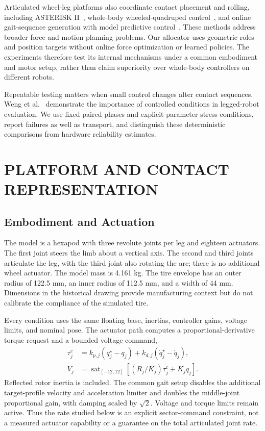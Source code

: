 \documentclass[letterpaper,10pt,conference]{ieeeconf}
\begin{document}
Articulated wheel-leg platforms also coordinate contact placement and rolling, including ASTERISK H~\cite{yoshioka2008asterisk}, whole-body wheeled-quadruped control~\cite{bjelonic2019keep}, and online gait-sequence generation with model predictive control~\cite{bjelonic2021wholebody}. These methods address broader force and motion planning problems. Our allocator uses geometric roles and position targets without online force optimization or learned policies. The experiments therefore test its internal mechanisms under a common embodiment and motor setup, rather than claim superiority over whole-body controllers on different robots.

Repeatable testing matters when small control changes alter contact sequences. Weng et al.~\cite{weng2024testing} demonstrate the importance of controlled conditions in legged-robot evaluation. We use fixed paired phases and explicit parameter stress conditions, report failures as well as transport, and distinguish these deterministic comparisons from hardware reliability estimates.

\section{PLATFORM AND CONTACT REPRESENTATION}
\subsection{Embodiment and Actuation}
The model is a hexapod with three revolute joints per leg and eighteen actuators. The first joint steers the limb about a vertical axis. The second and third joints articulate the leg, with the third joint also rotating the arc; there is no additional wheel actuator. The model mass is 4.161 kg. The tire envelope has an outer radius of 122.5 mm, an inner radius of 112.5 mm, and a width of 44 mm. Dimensions in the historical drawing provide manufacturing context but do not calibrate the compliance of the simulated tire.

Every condition uses the same floating base, inertias, controller gains, voltage limits, and nominal pose. The actuator path computes a proportional-derivative torque request and a bounded voltage command,
\begin{align}
 \tau_j^c&=k_{p,j}(q_j^\star-q_j)+k_{d,j}(\dot q_j^\star-\dot q_j),\\
 V_j&=\operatorname{sat}_{[-12,12]}[(R_j/K_j)\tau_j^c+K_j\dot q_j].
\end{align}
Reflected rotor inertia is included. The common gait setup disables the additional target-profile velocity and acceleration limiter and doubles the middle-joint proportional gain, with damping scaled by $\sqrt{2}$. Voltage and torque limits remain active. Thus the rate studied below is an explicit sector-command constraint, not a measured actuator capability or a guarantee on the total articulated joint rate.
\end{document}
